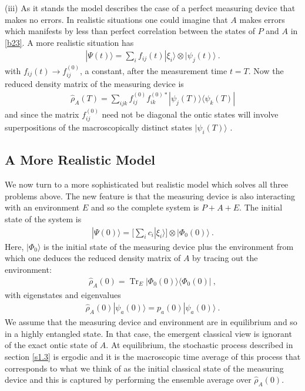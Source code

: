 \documentclass[%
preprint,
nofootinbib,
 amsmath,amssymb,
aps,
]{revtex4-1}
\def\BP{P}
\def\BA{A}
\newcommand{\Tr}{\operatorname{Tr}}
\def\bra#1{\langle #1|}
\def\ket#1{| #1\rangle}
\newcommand{\EQ}[1]{\begin{equation}\begin{split} #1
\end{split}\end{equation}}
\begin{document}
(iii) As it stands the model describes the case of a perfect measuring device that makes no errors. In realistic situations one could imagine that $\BA$ makes errors which manifests by less than perfect correlation between the states of $\BP$ and $\BA$ in \eqref{b23}. A more realistic situation has
\EQ{
\ket{\Psi(t)}=\sum_if_{ij}(t)\ket{\xi_i}\otimes\ket{\psi_j(t)}\ .
\label{b24}
}
with $f_{ij}(t)\to f^{(0)}_{ij}$, a constant, after the measurement time $t=T$.
Now the reduced density matrix of the measuring device is
\EQ{
\hat\rho_\BA(T)=\sum_{ijk}f_{ij}^{(0)}f^{(0)*}_{ik}\ket{\psi_j(T)}\bra{\psi_k(T)}
\label{cl2}
}
and since the matrix $f_{ij}^{(0)}$ need not be diagonal the ontic states will involve superpositions of the macroscopically distinct states $\ket{\psi_i(T)}$ \cite{albert1990wanted}.

\subsection{A More Realistic Model}\label{s2.2}

We now turn to a more sophisticated but realistic model which solves all three problems above. The new feature is that  the measuring device is also interacting with an environment $E$ and so the complete system is $\BP+\BA+E$. The initial state of the system is
\EQ{
\ket{\Psi(0)}=\Big[\sum_ic_i\ket{\xi_i}\Big]\otimes\ket{\Phi_0(0)}\ .
}
Here, $\ket{\Phi_0}$ is the initial state of the measuring device plus the environment
from which one deduces the reduced density matrix of $A$ by tracing out the environment:
\EQ{
\hat\rho_A(0)=\Tr_E\ket{\Phi_0(0)}\bra{\Phi_0(0)}\ ,
}
with eigenstates and eigenvalues
\EQ{
\hat\rho_A(0)\ket{\psi_a(0)}=p_a(0)\ket{\psi_a(0)}\ .
\label{yut}
}
We assume that the measuring device and environment are in equilibrium and so in a 
highly entangled state. In that case, the emergent classical view is ignorant of the exact ontic state of $A$. 
At equilibrium, the stochastic process described in section \ref{s1.3} is ergodic and it is
the macroscopic time average of this process that corresponds to what we think of as the initial classical state of the measuring device and this is captured by performing the ensemble average over $\hat\rho_A(0)$.
\end{document}
